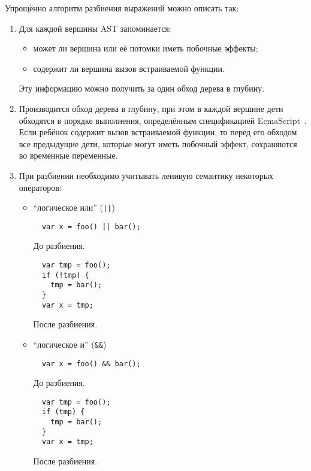 Упрощённо алгоритм разбиения выражений можно описать так:
\begin{enumerate}
  \item Для каждой вершины AST запоминается:
    \begin{itemize}
      \item может ли вершина или её потомки иметь побочные эффекты;
      \item содержит ли вершина вызов встраиваемой функции.
    \end{itemize}
    Эту информацию можно получить за один обход дерева в глубину.
  \item Производится обход дерева в глубину, при этом в каждой
  вершине дети обходятся в порядке выполнения, определённым
  спецификацией EcmaScript~\cite{EcmaScript}. Если ребёнок
  содержит вызов встраиваемой функции, то перед его обходом
  все предыдущие дети, которые могут иметь побочный эффект,
  сохраняются во временные переменные.
  \item При разбиении необходимо учитывать ленивую семантику некоторых
  операторов:
  \begin{itemize}

  \item ``логическое или'' (\texttt{||})
  \begin{listing}[H]
  \begin{verbatim}
  var x = foo() || bar();
  \end{verbatim}
  \caption{До разбиения.}
  \end{listing}

  \begin{listing}[H]
  \begin{verbatim}
  var tmp = foo();
  if (!tmp) {
    tmp = bar();
  }
  var x = tmp;
  \end{verbatim}
  \caption{После разбиения.}
  \end{listing}

  \item ``логическое и'' (\texttt{\&\&})
  \begin{listing}[H]
  \begin{verbatim}
  var x = foo() && bar();
  \end{verbatim}
  \caption{До разбиения.}
  \end{listing}

  \begin{listing}[H]
  \begin{verbatim}
  var tmp = foo();
  if (tmp) {
    tmp = bar();
  }
  var x = tmp;
  \end{verbatim}
  \caption{После разбиения.}
  \end{listing}


\end{itemize}
\end{enumerate}
